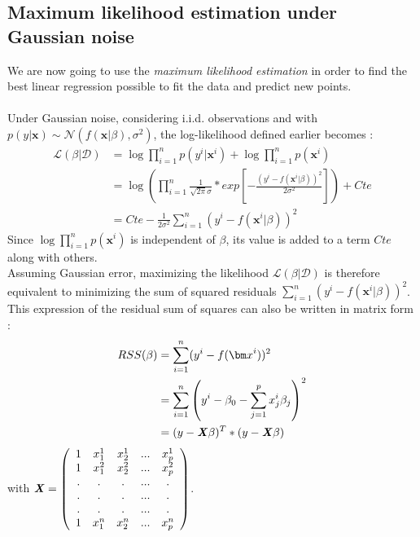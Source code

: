 \documentclass[a4paper,12pt]{article}
\newcommand{\dd}{\mathcal{D}}
\newcommand{\xx}{{\bm x}}
\begin{document}
\subsection{Maximum likelihood estimation under Gaussian noise}

We are now going to use the \textit{maximum likelihood estimation} in order to find the best linear regression possible to fit the data and predict new points. \\
\\
Under Gaussian noise, considering i.i.d. observations and with \(p(y|\xx)\sim{}\mathcal{N}(f(\xx|\beta),{\sigma}^2)\), the log-likelihood defined earlier becomes :
\begin{align*}
\mathcal{L}(\beta|\dd) &= \log\displaystyle\prod_{i=1}^{n} p(y^i|\xx^i) + \log\displaystyle\prod_{i=1}^{n} p(\xx^i) \\  &= \log \left(\displaystyle\prod_{i=1}^{n} \frac{1}{\sqrt{2\pi}\sigma}*exp\left[ - \frac{(y^i - f(\xx^i|\beta))^2}{2\sigma^2} \right] \right ) + Cte  \\
& = Cte - \frac{1}{2\sigma^2} \displaystyle\sum_{i=1}^{n} (y^i - f(\xx^i|\beta))^2
\end{align*}
Since \(\log\displaystyle\prod_{i=1}^{n} p(\xx^i)\) is independent of \(\beta\), its value is added to a term \(Cte\) along with others. \\
Assuming Gaussian error, maximizing the likelihood \(\mathcal{L}(\beta|\dd)\) is therefore equivalent to minimizing the sum of squared residuals \(\displaystyle\sum_{i=1}^{n} (y^i - f(\xx^i|\beta))^2\).
This expression of the residual sum of squares can also be written in matrix form :
\begin{align*}
RSS(\beta) &= \displaystyle\sum_{i=1}^{n} (y^i - f(\xx^i))^2 \\  &= \displaystyle\sum_{i=1}^{n} \left( y^i - \beta_0 - \displaystyle\sum_{j=1}^{p} x_j^i \beta_j \right)^2 \\
& = (y - \textbf{\textit{X}} \beta)^T * (y - \textbf{\textit{X}} \beta)
\end{align*}
with \(\textbf{\textit{X}} = \left( \begin{array}{ccccc}
1 & x_1^1 & x_2^1 & ... & x_p^1 \\
1 & x_1^2 & x_2^2 & ... & x_p^2 \\
. & . & . & ... & .\\
. & . & . & ... & .\\
. & . & . & ... & .\\
1 & x_1^n & x_2^n & ... & x_p^n \end{array} \right) \).
\end{document}
